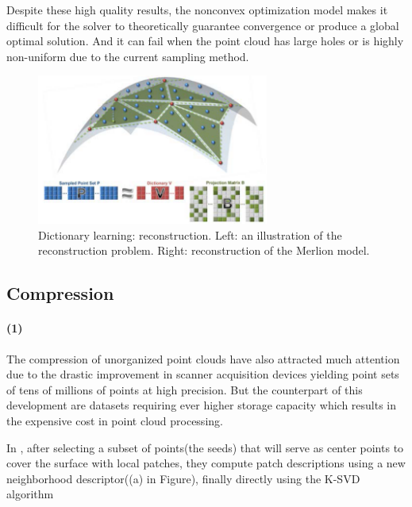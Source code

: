 Despite these high quality results, the nonconvex optimization model makes it difficult for the solver to theoretically guarantee convergence or produce a global optimal solution. And it can fail when the point cloud has large holes or is highly non-uniform due to the current sampling method.

\begin{figure}[ht]
  \centering
  \includegraphics[width=3in]{images/reconstruction_learning}
  \caption{Dictionary learning: reconstruction\cite{}. Left: an illustration of the reconstruction problem. Right: reconstruction of the Merlion model.}
\end{figure}



\subsection{Compression}

\paragraph{(1)}The compression of unorganized point clouds have also attracted much attention due to the drastic improvement in scanner acquisition devices yielding point sets of tens of millions of points at high precision. But the counterpart of this development are datasets requiring ever higher storage capacity which results in the expensive cost in point cloud processing.

In \cite{digne2014self}, after selecting a subset of points(the seeds) that will serve as center points to cover the surface with local patches,
they compute patch descriptions using a new neighborhood descriptor((a) in Figure),
finally directly using the K-SVD algorithm \cite{aharon2006svd}

